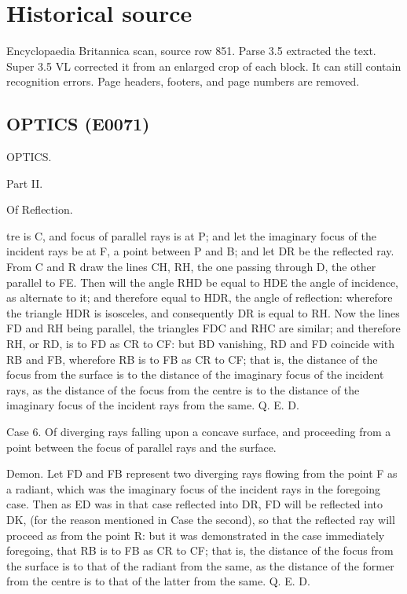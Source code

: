 \documentclass{article}
\begin{document}
\section*{Historical source}
Encyclopaedia Britannica scan, source row 851. Parse 3.5 extracted the text. Super 3.5 VL corrected it from an enlarged crop of each block. It can still contain recognition errors.
Page headers, footers, and page numbers are removed.

\subsection*{OPTICS (E0071)}
OPTICS.

Part II.

Of
Reflection.

tre is C, and focus of parallel rays is at P; and let the imaginary focus of the incident rays be at F, a point between P and B; and let DR be the reflected ray. From C and R draw the lines CH, RH, the one passing through D, the other parallel to FE. Then will the angle RHD be equal to HDE the angle of incidence, as alternate to it; and therefore equal to HDR, the angle of reflection: wherefore the triangle HDR is isosceles, and consequently DR is equal to RH. Now the lines FD and RH being parallel, the triangles FDC and RHC are similar; and therefore RH, or RD, is to FD as CR to CF: but BD vanishing, RD and FD coincide with RB and FB, wherefore RB is to FB as CR to CF; that is, the distance of the focus from the surface is to the distance of the imaginary focus of the incident rays, as the distance of the focus from the centre is to the distance of the imaginary focus of the incident rays from the same. Q. E. D.

Case 6. Of diverging rays falling upon a concave surface, and proceeding from a point between the focus of parallel rays and the surface.

Demon. Let FD and FB represent two diverging rays flowing from the point F as a radiant, which was the imaginary focus of the incident rays in the foregoing case. Then as ED was in that case reflected into DR, FD will be reflected into DK, (for the reason mentioned in Case the second), so that the reflected ray will proceed as from the point R: but it was demonstrated in the case immediately foregoing, that RB is to FB as CR to CF; that is, the distance of the focus from the surface is to that of the radiant from the same, as the distance of the former from the centre is to that of the latter from the same. Q. E. D.
\end{document}
